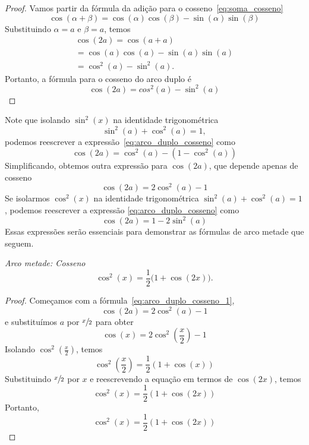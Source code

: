 \begin{proof}
    Vamos partir da fórmula da adição para o cosseno~\eqref{eq:soma_cosseno}
    \[
      \cos(\alpha + \beta)
      = \cos(\alpha)\cos(\beta) - \sin(\alpha)\sin(\beta)
    \]
    Substituindo $\alpha = a$ e $\beta = a$, temos
    \begin{align*}
      \cos(2a)
      = \cos(a + a)                     \\
      = \cos(a)\cos(a) - \sin(a)\sin(a) \\
      = \cos^2(a)-\sin^2(a).
    \end{align*}
    Portanto, a fórmula para o cosseno do arco duplo é
    \[
      \cos(2a) = cos^2(a)-\sin^2(a)
    \]
\end{proof}

Note que isolando $\sin^2(x)$ na identidade trigonométrica
\[
  \sin^2(a) + \cos^2(a) = 1,
\]
podemos reescrever a expressão~\eqref{eq:arco_duplo_cosseno} como
\[
  \cos(2a) = \cos^2(a) - \left(1 - \cos^2(a)\right)
\]
Simplificando, obtemos outra expressão para $\cos(2a)$, que depende
apenas de cosseno
\begin{equation}
  \label{eq:arco_duplo_cosseno_1}
  \cos(2a) = 2\cos^2(a) - 1
\end{equation}
Se isolarmos $\cos^2(x)$ na identidade trigonométrica
$\sin^2(a) + \cos^2(a) = 1$,
podemos reescrever a expressão \eqref{eq:arco_duplo_cosseno} como
\begin{equation}
  \label{eq:arco_duplo_cosseno_2}
  \cos(2a) = 1-2\sin^2(a)
\end{equation}
Essas expressões serão essenciais para demonstrar as fórmulas de arco
metade que seguem.

\emph{Arco metade: Cosseno}
\begin{equation}
  \label{eq:arco_metade_cosseno}
  \cos^2(x) = \frac{1}{2}\big(1+\cos(2x)\big).
\end{equation}

\begin{proof}
  Começamos com a fórmula~\eqref{eq:arco_duplo_cosseno_1},
  \[
    \cos(2a) = 2\cos^2(a) - 1
  \]
  e substituímos $a$ por $\sfrac{x}{2}$ para obter
  \[
    \cos(x) = 2\cos^2\left(\frac{x}{2}\right) - 1
  \]
  Isolando \(\cos^2\left(\frac{x}{2}\right)\), temos
  \[
    \cos^2\left(\frac{x}{2}\right) = \frac{1}{2}(1 + \cos(x))
  \]
  Substituindo $\sfrac{x}{2}$ por $x$ e reescrevendo a equação em
  termos de $\cos(2x)$, temos
  \[
    \cos^2(x) = \frac{1}{2}(1 + \cos(2x))
  \]
  Portanto,
  \[
    \cos^2(x)= \frac{1}{2}(1+\cos(2x))
  \]
\end{proof}

